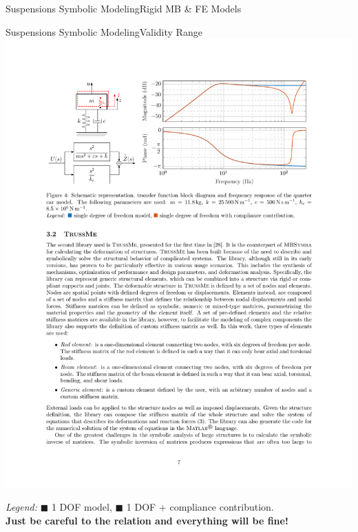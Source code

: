 \begin{frame}{Suspensions Symbolic Modeling}{Rigid \ac{MB} \& \ac{FE} Models}
\begin{minipage}[c]{0.40\linewidth}
  \end{minipage}
\end{frame}

\begin{frame}{Suspensions Symbolic Modeling}{Validity Range}
   \\[0.5em]
  \includegraphics[width=0.9\linewidth]{./figures/frequency_response.pdf}
  \begin{center}
    \emph{Legend:}
    {\color{mycolor1}$\blacksquare$} 1 DOF model, {\color{mycolor2}$\blacksquare$} 1 DOF + compliance contribution. \\[0.5em]
    \textcolor{mycolor5}{\textbf{Just be careful to the relation  and everything will be fine!}}
  \end{center}
\end{frame}



